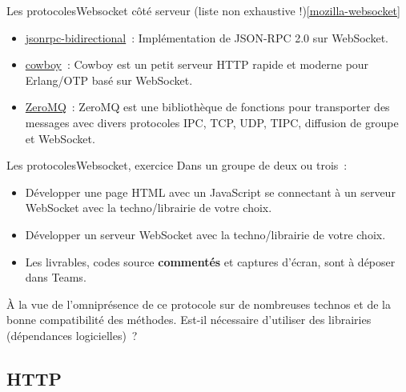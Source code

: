 \documentclass{beamer}
\begin{document}
\begin{frame}{Les protocoles}{Websocket côté serveur (liste non exhaustive !)\cref{mozilla-websocket}}
\begin{scriptsize}
\begin{itemize}
                \item \href{https://github.com/bigstepinc/jsonrpc-bidirectional}{jsonrpc-bidirectional}~: Implémentation de JSON-RPC 2.0 sur WebSocket.

                \item \href{https://github.com/ninenines/cowboy}{cowboy}~: Cowboy est un petit serveur HTTP rapide et moderne pour Erlang/OTP basé sur WebSocket.

                \item \href{https://zeromq.org}{ZeroMQ}~: ZeroMQ est une bibliothèque de fonctions pour transporter des messages avec divers protocoles IPC, TCP, UDP, TIPC, diffusion de groupe et WebSocket.

            \end{itemize}
        \end{scriptsize}
    \end{frame}

    \begin{frame}{Les protocoles}{Websocket, exercice \execcounterdispinc{}}
        Dans un groupe de deux ou trois~:
        \begin{itemize}
            \item Développer une page HTML avec un JavaScript se connectant à un serveur WebSocket avec la techno/librairie de votre choix.
            \item Développer un serveur WebSocket avec la techno/librairie de votre choix.
            \item Les livrables, codes source \textbf{commentés} et captures d'écran, sont à déposer dans Teams.
        \end{itemize}
        \begin{dangercolorbox}
            À la vue de l'omniprésence de ce protocole sur de nombreuses technos et de la bonne compatibilité des méthodes.
            Est-il nécessaire d'utiliser des librairies (dépendances logicielles)~?
        \end{dangercolorbox}
    \end{frame}

    \subsection{HTTP}\label{subsec:http}
\end{document}
